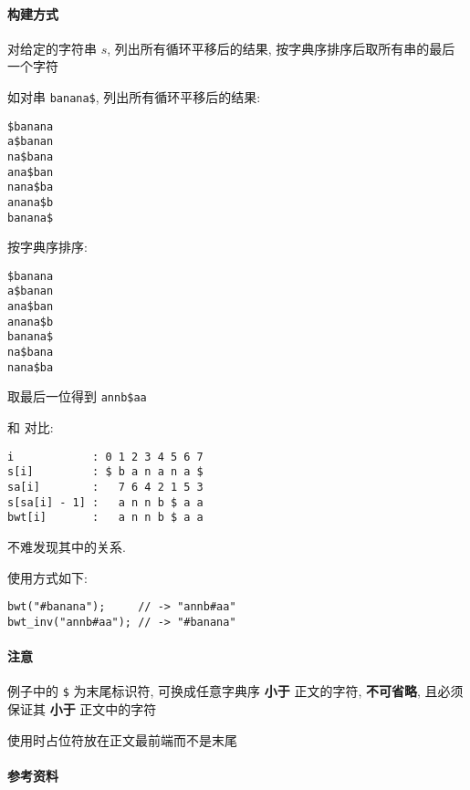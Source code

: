 \paragraph{构建方式}

对给定的字符串 \(s\), 列出所有循环平移后的结果, 按字典序排序后取所有串的最后一个字符

如对串 \verb|banana$|, 列出所有循环平移后的结果:

\begin{verbatim}
$banana
a$banan
na$bana
ana$ban
nana$ba
anana$b
banana$
\end{verbatim}

按字典序排序:

\begin{verbatim}
$banana
a$banan
ana$ban
anana$b
banana$
na$bana
nana$ba
\end{verbatim}

取最后一位得到 \verb|annb$aa|

和  对比:

\begin{verbatim}
i            : 0 1 2 3 4 5 6 7
s[i]         : $ b a n a n a $
sa[i]        :   7 6 4 2 1 5 3
s[sa[i] - 1] :   a n n b $ a a
bwt[i]       :   a n n b $ a a
\end{verbatim}

不难发现其中的关系.

使用方式如下:

\begin{verbatim}
bwt("#banana");     // -> "annb#aa"
bwt_inv("annb#aa"); // -> "#banana"
\end{verbatim}

\paragraph{注意}

例子中的 \verb|$| 为末尾标识符, 可换成任意字典序 \textbf{小于} 正文的字符, \textbf{不可省略}, 且必须保证其 \textbf{小于} 正文中的字符

使用时占位符放在正文最前端而不是末尾

\paragraph{参考资料} \cite{enwiki:1214062423}

